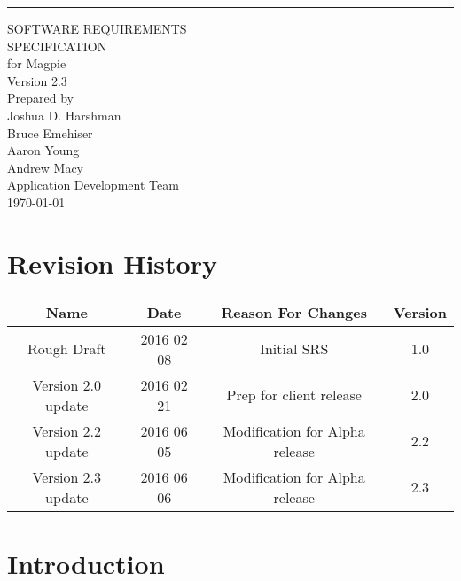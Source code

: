 \documentclass{scrreprt}
\date{}
\def\myversion{2.3 }
\begin{document}
\begin{flushright}
    \rule{16cm}{5pt}\vskip1cm
    \begin{bfseries}
        \Huge{SOFTWARE REQUIREMENTS\\ SPECIFICATION}\\
        \vspace{1.0cm}
        for Magpie \\
        \vspace{1cm}
        \LARGE{Version \myversion}\\
        \vspace{1.5cm}
        Prepared by\\Joshua D. Harshman\\Bruce Emehiser\\Aaron Young\\Andrew Macy\\
        \vspace{1.9cm}
        Application Development Team\\
        \vspace{1.9cm}
        \today\\
    \end{bfseries}
\end{flushright}

\tableofcontents

\chapter*{Revision History}

\begin{center}
    \begin{tabular}{|c|c|c|c|}
        \hline
	    Name & Date & Reason For Changes & Version \\
        \hline
	    Rough Draft & 2016 02 08 & Initial SRS & 1.0 \\
        \hline
        Version 2.0 update & 2016 02 21 & Prep for client release & 2.0 \\
        \hline
        Version 2.2 update & 2016 06 05 & Modification for Alpha release & 2.2 \\
        \hline
        Version 2.3 update & 2016 06 06 & Modification for Alpha release & 2.3 \\
        \hline
    \end{tabular}
\end{center}

\chapter{Introduction}
\end{document}
